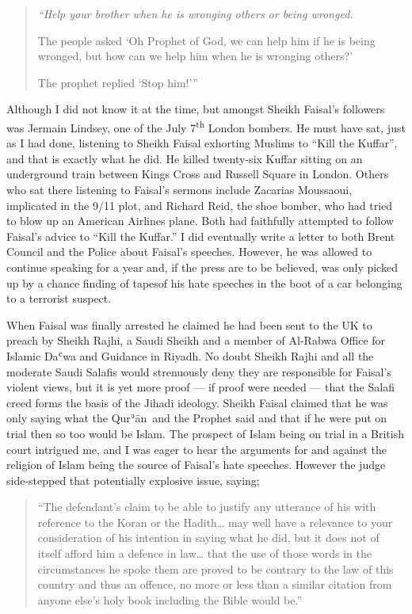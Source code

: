 \documentclass[12pt]{memoir}
\def\´{ʾ} %
\def\`{ʿ} %
\let \Sup=\textsuperscript
\newcommand{\cor}[2]{#2} %
\def \Quran{Qur\-\´ān} %
\begin{document}
\begin{quote}
\itshape
“Help your brother when he is wronging others or being wronged.

The people asked ‘Oh Prophet of God, we can help him if he is being wronged,
but how can we help him when he is wronging others?’

The prophet replied ‘Stop him!’”
\end{quote}

Although I did not know it at the time,
but amongst Sheikh Faisal’s followers was Jermain Lindsey,
one of the July 7\Sup{th} London bombers.
He must have sat, just as I had done, listening to Sheikh Faisal
exhorting Muslims to “Kill the Kuffar”, and that is exactly what he did.
He killed twenty-six Kuffar sitting on an underground train
between Kings Cross and Russell Square in London.
Others who sat there listening to Faisal’s sermons include Zacarias Moussaoui,
implicated in the 9/11 plot, and Richard Reid, the shoe bomber,
who had tried to blow up an American Airlines plane.
Both had faithfully attempted to follow Faisal’s advice to “Kill the Kuffar.”
I did eventually write a letter to both Brent Council
and the Police about Faisal’s speeches.
However, he was allowed to continue speaking for a year and,
if the press are to be believed,
was only picked up by a chance finding of tapesof his hate speeches
in the boot of a car belonging to a terrorist suspect.

When Faisal was finally arrested he claimed he had been sent to the UK
to preach by Sheikh Rajhi, a Saudi Sheikh and a member of Al-Rabwa Office
for Islamic Da\`wa and Guidance in Riyadh.
No doubt Sheikh Rajhi and all the moderate Saudi Salafis
would strenuously deny they are responsible for Faisal’s violent views,
but it is yet more proof — if proof were needed —
that the Salafi creed forms the basis of the Jihadi ideology.
Sheikh Faisal claimed that he was only saying what the \Quran\
and the Prophet said and that if he were put on \cor{trail}{trial}
then so too would be Islam.
The prospect of Islam being on trial in a British court intrigued me,
and I was eager to hear the arguments for and against the religion of Islam
being the source of Faisal’s hate speeches.
However the judge side-stepped that potentially explosive issue, saying;

\begin{quote}
“The defendant’s claim \cor{to be}{} to be able to justify any utterance
of his with reference to the Koran or the Hadith…
may well have a relevance to your consideration of his intention
in saying what he did, but it does not of itself afford him a defence in law…
that the use of those words in the circumstances he spoke them
are proved to be contrary to the law of this country and thus an offence,
no more or less than a similar citation from anyone else’s holy book
including the Bible would be.”
\end{quote}
\end{document}
